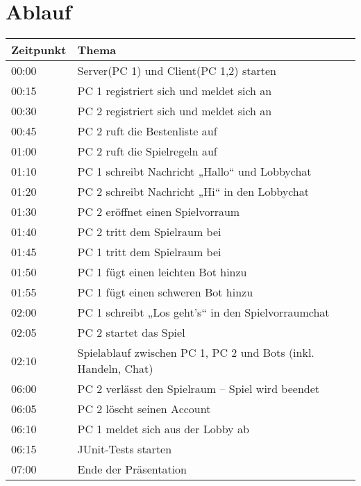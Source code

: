\chapter{Ablauf}
\begin{tabular}[h]{l|X|l}
	Zeitpunkt & Thema\\
	\hline
	00:00 & Server(PC 1) und Client(PC 1,2) starten\\
	00:15 & PC 1 registriert sich und meldet sich an\\
	00:30 & PC 2 registriert sich und meldet sich an\\
	00:45 & PC 2 ruft die Bestenliste auf\\
	01:00 & PC 2 ruft die Spielregeln auf\\
	01:10 & PC 1 schreibt Nachricht „Hallo“ und Lobbychat\\
	01:20 & PC 2 schreibt Nachricht „Hi“ in den Lobbychat\\
	01:30 & PC 2 eröffnet einen Spielvorraum\\
	01:40 & PC 2 tritt dem Spielraum bei\\
	01:45 & PC 1 tritt dem Spielraum bei\\
	01:50 & PC 1 fügt einen leichten Bot hinzu\\
	01:55 & PC 1 fügt einen schweren Bot hinzu\\
	02:00 & PC 1 schreibt „Los geht’s“ in den Spielvorraumchat\\
	02:05 & PC 2 startet das Spiel\\
	02:10 & Spielablauf zwischen PC 1, PC 2 und Bots (inkl. Handeln, Chat)\\
	06:00 & PC 2 verlässt den Spielraum – Spiel wird beendet\\
	06:05 & PC 2 löscht seinen Account\\
	06:10 & PC 1 meldet sich aus der Lobby ab\\
	06:15 & JUnit-Tests starten\\
	07:00 & Ende der Präsentation\\
\end{tabular}